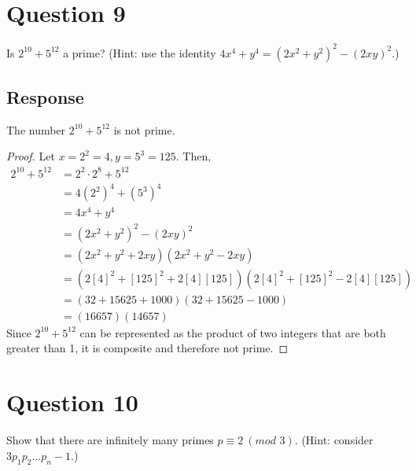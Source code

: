\documentclass[13pt]{article}
\begin{document}
\newpage
\section*{Question 9}
Is $2^{10} + 5^{12}$ a prime? (Hint: use the identity $4x^4 + y^4 = (2x^2 + y^2)^2 - (2xy)^2$.)

\subsection*{Response}
The number $2^{10} + 5^{12}$ is not prime.
\begin{proof}
  Let $x = 2^2 = 4, y = 5^3 = 125$. Then,
  \begin{align*}
    2^{10} + 5^{12} &= 2^2 \cdot 2^8 + 5^{12} \\
                    &= 4(2^2)^4 + (5^3)^4 \\
                    &= 4x^4 + y^4 \\
                    &= (2x^2 + y^2)^2 - (2xy)^2 \\
                    &= (2x^2 + y^2 + 2xy)(2x^2 + y^2 - 2xy) \\
                    &= (2[4]^2 + [125]^2 + 2[4][125])(2[4]^2 + [125]^2 - 2[4][125]) \\
                    &= (32 + 15625 + 1000)(32 + 15625 - 1000) \\
                    &= (16657)(14657)
  \end{align*}
  Since $2^{10} + 5^{12}$ can be represented as the product of two integers that are both greater
  than 1, it is composite and therefore not prime.
\end{proof}




\newpage
\section*{Question 10}
Show that there are infinitely many primes $p \equiv 2 \ (\textit{mod } 3)$. (Hint: consider
$3p_1p_2 \ldots p_n - 1$.)
\end{document}
